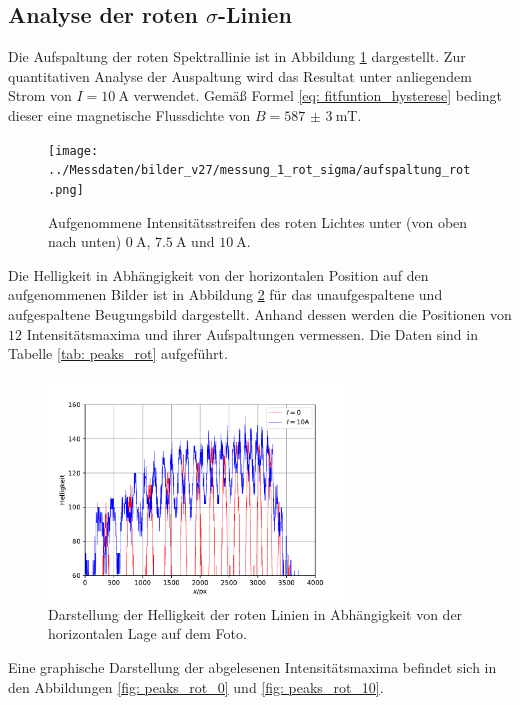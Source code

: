 \subsection{Analyse der roten $\sigma$-Linien}
Die Aufspaltung der roten Spektrallinie ist in Abbildung \ref{fig: aufspaltung_rot} dargestellt. Zur quantitativen Analyse der Auspaltung wird das
Resultat unter anliegendem Strom von $I = \SI{10}{\ampere}$ verwendet. Gemäß Formel \eqref{eq: fitfuntion_hysterese} bedingt dieser
eine magnetische Flussdichte von $B = \SI{587(3)}{\milli\tesla}$.
\begin{figure}
  \centering
  \texttt{[image: ../Messdaten/bilder\_v27/messung\_1\_rot\_sigma/aufspaltung\_rot.png]}
  \caption{Aufgenommene Intensitätsstreifen des roten Lichtes unter (von oben nach unten) $\SI{0}{\ampere}$, $\SI{7.5}{\ampere}$ und $\SI{10}{\ampere}$.}
  \label{fig: aufspaltung_rot}
\end{figure}
Die Helligkeit in Abhängigkeit von der horizontalen Position auf den aufgenommenen Bilder ist in Abbildung \ref{fig: rot_intensität} für das unaufgespaltene
und aufgespaltene Beugungsbild dargestellt. Anhand dessen werden die Positionen von $12$ Intensitätsmaxima und ihrer Aufspaltungen
vermessen. Die Daten sind in Tabelle \ref{tab: peaks_rot} aufgeführt.
\begin{figure}
  \centering
  \includegraphics[width = 0.7\textwidth]{../Messdaten/plots/rot_sigma_intensitaet.pdf}
  \caption{Darstellung der Helligkeit der roten Linien in Abhängigkeit von der horizontalen Lage auf dem Foto.}
  \label{fig: rot_intensität}
\end{figure}

Eine graphische Darstellung der abgelesenen Intensitätsmaxima befindet sich in den Abbildungen \ref{fig: peaks_rot_0} und \ref{fig: peaks_rot_10}.
